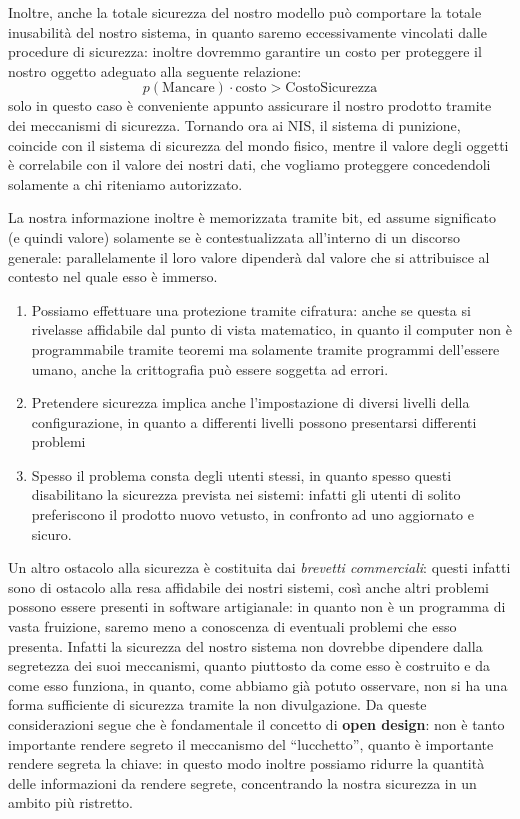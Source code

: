 Inoltre, anche la totale sicurezza del nostro modello può comportare la
totale inusabilità del nostro sistema, in quanto saremo eccessivamente
vincolati dalle procedure di sicurezza: inoltre dovremmo garantire un costo
per proteggere il nostro oggetto adeguato alla seguente relazione:
\[p(\textrm{Mancare})\cdot \textrm{costo}>\textrm{CostoSicurezza}\]
solo in questo caso è conveniente appunto assicurare il nostro prodotto tramite
dei meccanismi di sicurezza. Tornando ora ai NIS, il sistema di punizione,
coincide con il sistema di sicurezza del mondo fisico, mentre
il valore degli oggetti è correlabile con il valore dei nostri dati, che vogliamo
proteggere concedendoli solamente a chi riteniamo autorizzato.


La nostra informazione inoltre è memorizzata tramite bit, ed assume significato
(e quindi valore) solamente se è contestualizzata all'interno di un discorso
generale: parallelamente il loro valore dipenderà dal valore che si attribuisce
al contesto nel quale esso è immerso.
\begin{enumerate}
\item Possiamo effettuare una protezione tramite cifratura: anche se questa
	si rivelasse affidabile dal punto di vista matematico, in quanto il
	computer non è programmabile tramite teoremi ma solamente tramite
	programmi dell'essere umano, anche la crittografia può essere soggetta
	ad errori.
\item Pretendere sicurezza implica anche l'impostazione di diversi livelli della
	configurazione, in quanto a differenti livelli possono presentarsi
	differenti problemi
\item Spesso il problema consta degli utenti stessi, in quanto spesso questi
	disabilitano la sicurezza prevista nei sistemi: infatti gli utenti
	di solito preferiscono il prodotto nuovo vetusto, in confronto ad uno
	aggiornato e sicuro.
\end{enumerate}

Un altro ostacolo alla sicurezza è costituita dai \textit{brevetti commerciali}:
questi infatti sono di ostacolo alla resa affidabile dei nostri sistemi, così
anche altri problemi possono essere presenti in software artigianale: in quanto
non è un programma di vasta fruizione, saremo meno a conoscenza di eventuali
problemi che esso presenta. Infatti la sicurezza del nostro sistema non 
dovrebbe dipendere dalla segretezza dei suoi meccanismi, quanto piuttosto 
da come esso è costruito e da come esso funziona, in quanto, come abbiamo già 
potuto osservare, non si ha una forma sufficiente di sicurezza tramite la non
divulgazione. Da queste considerazioni segue che è fondamentale il concetto di 
\textbf{open design}: non è tanto importante rendere segreto il meccanismo del
``lucchetto'', quanto è importante rendere segreta la chiave: in questo modo
inoltre possiamo ridurre la quantità delle informazioni da rendere segrete,
concentrando la nostra sicurezza in un ambito più ristretto.

